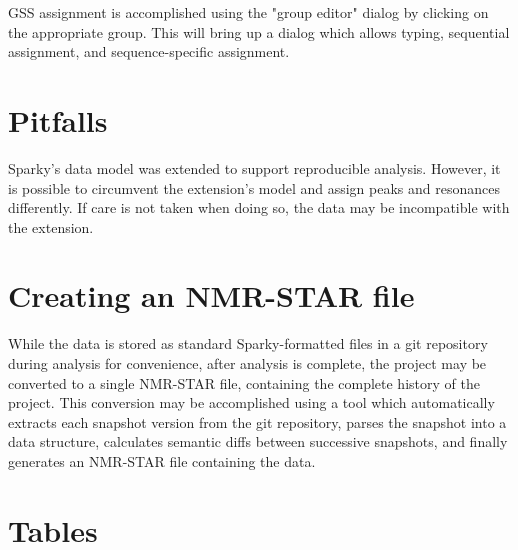 GSS assignment is accomplished using the "group editor" dialog by clicking on
the appropriate group.  This will bring up a dialog which allows typing,
sequential assignment, and sequence-specific assignment.



\section{Pitfalls}
Sparky's data model was extended to support reproducible analysis.
However, it is possible to circumvent the extension's model and assign peaks
and resonances differently. If care is not taken when doing so, the data
may be incompatible with the extension.

\section{Creating an NMR-STAR file}
While the data is stored as standard Sparky-formatted files in a git repository
during analysis for convenience, after analysis is complete, the project
may be converted to a single NMR-STAR file, containing the complete history
of the project.  This conversion may be accomplished using a tool which
automatically extracts each snapshot version from the git repository, 
parses the snapshot into a data structure,
calculates semantic diffs between successive snapshots, 
and finally generates an NMR-STAR file containing the data.

 

\clearpage
\section{Tables}

